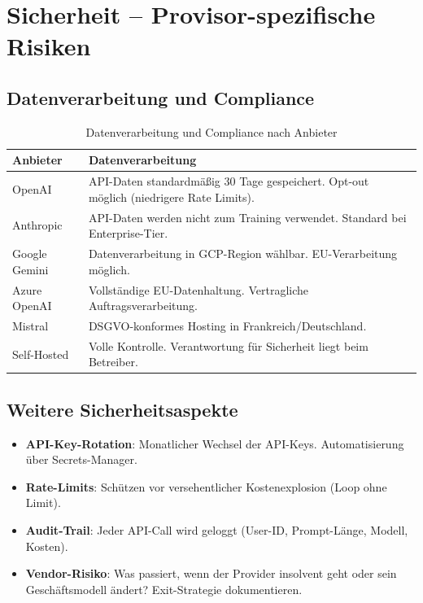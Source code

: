\section{Sicherheit -- Provisor-spezifische Risiken}

\subsection{Datenverarbeitung und Compliance}

\begin{table}[H]
\centering
\begin{tabularx}{\linewidth}{lX}
\toprule
\textbf{Anbieter} & \textbf{Datenverarbeitung} \\
\midrule
OpenAI & API-Daten standardmäßig 30 Tage gespeichert. Opt-out möglich (niedrigere Rate Limits). \\
Anthropic & API-Daten werden nicht zum Training verwendet. Standard bei Enterprise-Tier. \\
Google Gemini & Datenverarbeitung in GCP-Region wählbar. EU-Verarbeitung möglich. \\
Azure OpenAI & Vollständige EU-Datenhaltung. Vertragliche Auftragsverarbeitung. \\
Mistral & DSGVO-konformes Hosting in Frankreich/Deutschland. \\
Self-Hosted & Volle Kontrolle. Verantwortung für Sicherheit liegt beim Betreiber. \\
\bottomrule
\end{tabularx}
\caption{Datenverarbeitung und Compliance nach Anbieter}
\label{tab:compliance}
\end{table}

\subsection{Weitere Sicherheitsaspekte}

\begin{itemize}[leftmargin=*]
    \item \textbf{API-Key-Rotation}: Monatlicher Wechsel der API-Keys. Automatisierung über Secrets-Manager.
    \item \textbf{Rate-Limits}: Schützen vor versehentlicher Kostenexplosion (Loop ohne Limit).
    \item \textbf{Audit-Trail}: Jeder API-Call wird geloggt (User-ID, Prompt-Länge, Modell, Kosten).
    \item \textbf{Vendor-Risiko}: Was passiert, wenn der Provider insolvent geht oder sein Geschäftsmodell ändert? Exit-Strategie dokumentieren.
\end{itemize}

